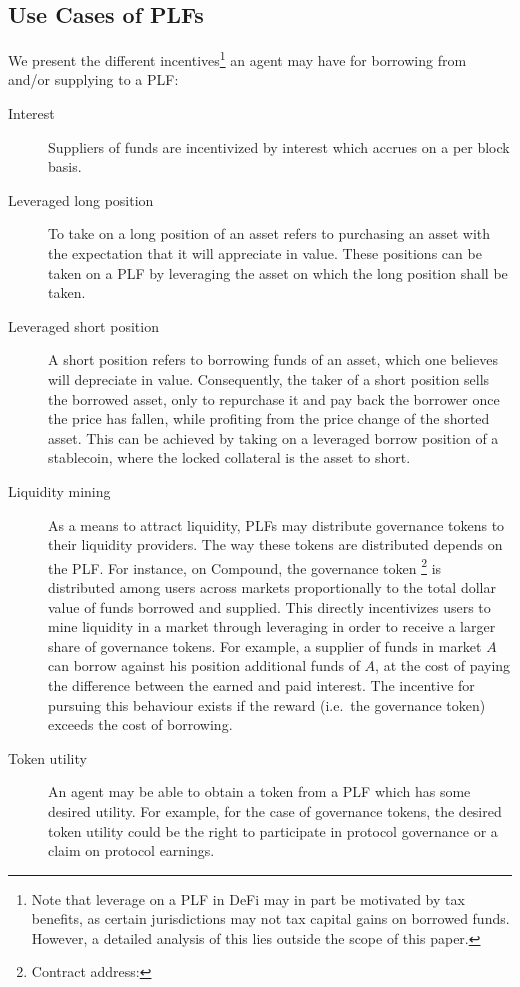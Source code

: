\subsection{Use Cases of PLFs}
We present the different incentives\footnote{Note that leverage on a PLF in DeFi may in part be motivated by tax benefits, as certain jurisdictions may not tax capital gains on borrowed funds. 
However, a detailed analysis of this lies outside the scope of this paper.} an agent may have for borrowing from and/or supplying to a PLF:
\begin{description}
    \item[Interest] Suppliers of funds are incentivized by interest which accrues on a per block basis.

    \item[Leveraged long position] To take on a long position of an asset refers to purchasing an asset with the expectation that it will appreciate in value. 
    These positions can be taken on a PLF by leveraging the asset on which the long position shall be taken.

    \item[Leveraged short position] A short position refers to borrowing funds of an asset, which one believes will depreciate in value. 
    Consequently, the taker of a short position sells the borrowed asset, only to repurchase it and pay back the borrower once the price has fallen, while profiting from the price change of the shorted asset.
    This can be achieved by taking on a leveraged borrow position of a stablecoin, where the locked collateral is the asset to short.

    \item[Liquidity mining] As a means to attract liquidity, PLFs may distribute governance tokens to their liquidity providers.
    The way these tokens are distributed depends on the PLF. 
    For instance, on Compound, the governance token \footnote{Contract address: } is distributed among users across markets proportionally to the total dollar value of funds borrowed and supplied.
    This directly incentivizes users to mine liquidity in a market through leveraging in order to receive a larger share of governance tokens.
    For example, a supplier of funds in market $A$ can borrow against his position additional funds of $A$, at the cost of paying the difference between the earned and paid interest. 
    The incentive for pursuing this behaviour exists if the reward (i.e.\ the governance token) exceeds the cost of borrowing.
    
    \item[Token utility] An agent may be able to obtain a token from a PLF which has some desired utility.
    For example, for the case of governance tokens, the desired token utility could be the right to participate in protocol governance or a claim on protocol earnings.
    
    
\end{description}


